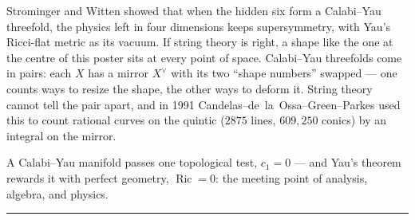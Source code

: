 \documentclass[12pt]{article}
\newcommand{\auterm}[1]{{\SansSemibold #1}}
\begin{document}
\begin{minipage}[t][\BodyH][s]{0.285\textwidth}
Strominger and Witten showed that when the hidden six form a
Calabi--Yau threefold, the physics left in four dimensions keeps
supersymmetry, with Yau's Ricci-flat metric as its vacuum. If string
theory is right, a shape like the one at the centre of this poster
sits at every point of space.
\vfill
{}
Calabi--Yau threefolds come in pairs: each $X$ has a \auterm{mirror}
$X^{\vee}$ with its two ``shape numbers'' swapped --- one counts ways
to resize the shape, the other ways to deform it. String theory cannot
tell the pair apart, and in 1991 Candelas--de~la~Ossa--Green--Parkes
used this to count rational curves on the quintic ($2875$ lines,
$609{,}250$ conics) by an integral on the mirror.
\vfill
{}
{\Serif\fontsize{27}{38}\selectfont\raggedright
A Calabi--Yau manifold passes one topological test, $c_1 = 0$ ---
and Yau's theorem rewards it with perfect geometry,
$\operatorname{Ric} = 0$: the meeting point of analysis, algebra, and
physics.\par}

\end{minipage}

\vspace*{\fill}

{\color{DividerWarm}\rule{\textwidth}{1.4pt}}
\vspace{0.6em}
\end{document}
